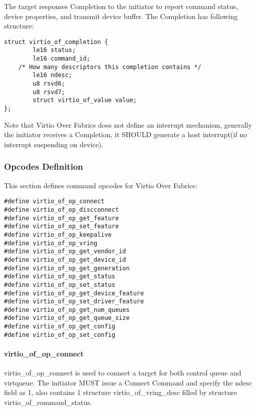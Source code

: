 The target responses Completion to the initiator to report command status, device properties, and transmit device buffer. The Completion has following structure:

\begin{lstlisting}
struct virtio_of_completion {
        le16 status;
        le16 command_id;
	/* How many descriptors this completion contains */
        le16 ndesc;
        u8 rsvd6;
        u8 rsvd7;
        struct virtio_of_value value;
};
\end{lstlisting}

Note that Virtio Over Fabrics does not define an interrupt mechanism, generally the initiator receives a Completion, it SHOULD generate a host interrupt(if no interrupt suspending on device).

\subsubsection{Opcodes Definition}\label{sec:Virtio Transport Options / Virtio Over Fabrics / Transmition Protocol / Opcodes Definition}
This section defines command opcodes for Virtio Over Fabrics:

\begin{lstlisting}
#define virtio_of_op_connect
#define virtio_of_op_discconnect
#define virtio_of_op_get_feature
#define virtio_of_op_set_feature
#define virtio_of_op_keepalive
#define virtio_of_op_vring
#define virtio_of_op_get_vendor_id
#define virtio_of_op_get_device_id
#define virtio_of_op_get_generation
#define virtio_of_op_get_status
#define virtio_of_op_set_status
#define virtio_of_op_get_device_feature
#define virtio_of_op_set_driver_feature
#define virtio_of_op_get_num_queues
#define virtio_of_op_get_queue_size
#define virtio_of_op_get_config
#define virtio_of_op_set_config
\end{lstlisting}

\paragraph{virtio_of_op_connect}\label{sec:Virtio Transport Options / Virtio Over Fabrics / Transmition Protocol / Opcodes Definition / virtio_of_op_connect}

virtio_of_op_connect is used to connect a target for both control queue and virtqueue. The initiator MUST issue a Connect Command and specify the ndesc field as 1, also contains 1 structure virtio_of_vring_desc filled by structure virtio_of_command_status.


